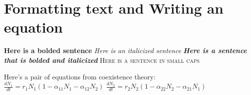 \documentclass[12pt]{article}
\begin{document}
\section{Formatting text and Writing an equation}

\textbf{Here is a bolded sentence}     
\newline
\textit{Here is an italicized sentence}     
\newline
\textit{\textbf{Here is a sentence that is bolded and italicized}}    
\newline
\textsc{Here is a sentence in small caps}   
\newline

Here's a pair of equations from coexistence theory:
\newline
$\frac{dN_{1}}{dt} = r_{1}N_{1} (1 - \alpha_{11}N_{1} - \alpha_{12}N_{2})$
$\frac{dN_{2}}{dt} = r_{2}N_{2} (1 - \alpha_{22}N_{2} - \alpha_{21}N_{1})$
\end{document}
